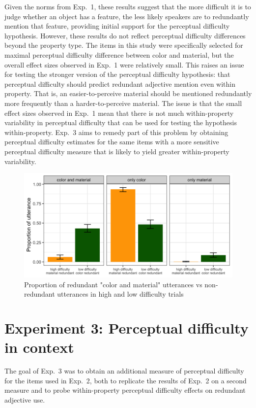 \documentclass[12pt,letterpaper]{article}
\begin{document}
Given the norms from Exp.~1, these results suggest that the more difficult it is to judge whether an object has a feature, the less likely speakers are to redundantly mention that feature, providing initial support for the perceptual difficulty hypothesis. However, these results do not reflect perceptual difficulty differences beyond the property type. The items in this study were specifically selected for maximal perceptual difficulty difference between color and material, but the overall effect sizes observed in Exp.~1 were relatively small. This raises an issue for testing the stronger version of the perceptual difficulty hypothesis: that perceptual difficulty should predict redundant adjective mention even within property. That is, an easier-to-perceive material should be mentioned redundantly more frequently than a harder-to-perceive material. The issue is that the small effect sizes observed in Exp.~1 mean that there is not much within-property variability in perceptual difficulty that can be used for testing the hypothesis within-property. Exp.~3 aims to remedy part of this problem by obtaining perceptual difficulty estimates for the same items with a more sensitive perceptual difficulty measure that is likely to yield greater within-property variability.

\begin{figure}[ht]
\centering
\includegraphics[width=.8\textwidth]{plots/exp2_proportion.png}
\caption{Proportion of redundant "color and material" utterances vs non-redundant utterances in high and low difficulty trials}
\label{fig:exp2_proportion}
\end{figure}

\section{Experiment 3: Perceptual difficulty in context} 

The goal of Exp.~3 was to obtain an additional measure of perceptual difficulty for the items used in Exp.~2, both to replicate the results of Exp.~2 on a second measure and to probe within-property perceptual difficulty effects on redundant adjective use.
\end{document}
